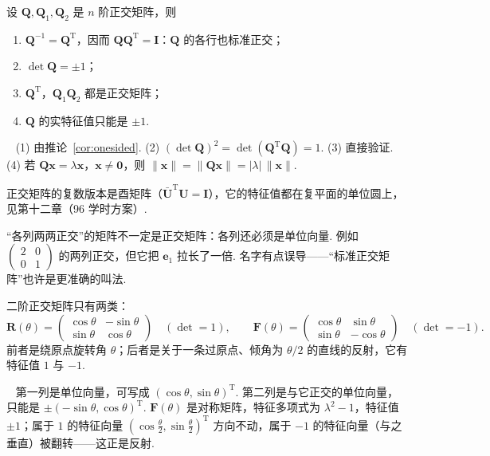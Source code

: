 \documentclass[lang=cn,10.5pt,scheme=chinese,toc=twocol,section,chinesefont=nofont,
twoside,citestyle=gb7714-2015,bibstyle=gb7714-2015]{elegantbook}
\DeclareRobustCommand{\textbf}[1]{{\lnsemiboldlatin\lnsemiboldcjk #1}}
\newcommand{\vv}[1]{\boldsymbol{#1}}
\newcommand{\zero}{\boldsymbol{0}}          %
\newcommand{\trans}{\mathrm{T}}             %
\numberwithin{equation}{section}   %
\newcommand*{\lnlabel}[1]{{\sffamily\bfseries\color{black}#1}}
\renewenvironment{proof}{%
	\par\noindent\lnlabel{\proofname}\;\ \color{black!90}\cfs}{\par}
\begin{document}
\begin{proposition}
  \label{prop:orthmatrix}
  设 $\vv Q,\vv Q_1,\vv Q_2$ 是 $n$ 阶正交矩阵，则
  \begin{enumerate}
    \item $\vv Q^{-1}=\vv Q^\trans$，因而 $\vv Q\vv Q^\trans=\vv I$：$\vv Q$ 的各行也标准正交；
    \item $\det\vv Q=\pm1$；
    \item $\vv Q^\trans$，$\vv Q_1\vv Q_2$ 都是正交矩阵；
    \item $\vv Q$ 的实特征值只能是 $\pm1$.
  \end{enumerate}
\end{proposition}
\begin{proof}
  (1) 由推论~\ref{cor:onesided}. (2) $(\det\vv Q)^2=\det(\vv Q^\trans\vv Q)=1$. (3) 直接验证. (4) 若 $\vv{Qx}=\lambda\vv x$，$\vv x\ne\zero$，则 $\|\vv x\|=\|\vv{Qx}\|=|\lambda|\,\|\vv x\|$.
\end{proof}

正交矩阵的复数版本是酉矩阵（$\bar{\vv U}^\trans\vv U=\vv I$），它的特征值都在复平面的单位圆上，见第十二章（96 学时方案）.%

\begin{pitfallbox}
  “各列两两正交”的矩阵\textbf{不一定}是正交矩阵：各列还必须是单位向量. 例如 $
    \begin{pmatrix}
      2 & 0 \\0&1
    \end{pmatrix}
  $ 的两列正交，但它把 $\vv e_1$ 拉长了一倍. 名字有点误导——“标准正交矩阵”也许是更准确的叫法.
\end{pitfallbox}

\begin{theorem}[平面上的正交变换]\label{thm:orth2d}
  二阶正交矩阵只有两类：
  \[\vv R(\theta)=
    \begin{pmatrix}
      \cos\theta & -\sin\theta \\ \sin\theta&\cos\theta
    \end{pmatrix}
    \quad(\det=1),\qquad
    \vv F(\theta)=
    \begin{pmatrix}
      \cos\theta & \sin\theta \\ \sin\theta&-\cos\theta
    \end{pmatrix}
    \quad(\det=-1).\]
  前者是绕原点旋转角 $\theta$；后者是关于一条过原点、倾角为 $\theta/2$ 的直线的反射，它有特征值 $1$ 与 $-1$.
\end{theorem}
\begin{proof}
  第一列是单位向量，可写成 $(\cos\theta,\sin\theta)^\trans$. 第二列是与它正交的单位向量，只能是 $\pm(-\sin\theta,\cos\theta)^\trans$. $\vv F(\theta)$ 是对称矩阵，特征多项式为 $\lambda^2-1$，特征值 $\pm1$；属于 $1$ 的特征向量 $(\cos\frac\theta2,\sin\frac\theta2)^\trans$ 方向不动，属于 $-1$ 的特征向量（与之垂直）被翻转——这正是反射.
\end{proof}
\end{document}
